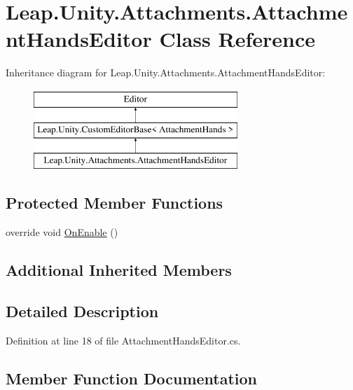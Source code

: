 \hypertarget{class_leap_1_1_unity_1_1_attachments_1_1_attachment_hands_editor}{}\section{Leap.\+Unity.\+Attachments.\+Attachment\+Hands\+Editor Class Reference}
\label{class_leap_1_1_unity_1_1_attachments_1_1_attachment_hands_editor}
Inheritance diagram for Leap.\+Unity.\+Attachments.\+Attachment\+Hands\+Editor\+:\begin{figure}[H]
\begin{center}
\leavevmode
\includegraphics[height=3.000000cm]{class_leap_1_1_unity_1_1_attachments_1_1_attachment_hands_editor}
\end{center}
\end{figure}
\subsection*{Protected Member Functions}
\begin{DoxyCompactItemize}
\item 
override void \mbox{\hyperlink{class_leap_1_1_unity_1_1_attachments_1_1_attachment_hands_editor_a94eeefd2eca2a58e94d70632d3d79603}{On\+Enable}} ()
\end{DoxyCompactItemize}
\subsection*{Additional Inherited Members}


\subsection{Detailed Description}


Definition at line 18 of file Attachment\+Hands\+Editor.\+cs.



\subsection{Member Function Documentation}
\mbox{\label{class_leap_1_1_unity_1_1_attachments_1_1_attachment_hands_editor_a94eeefd2eca2a58e94d70632d3d79603}} 
